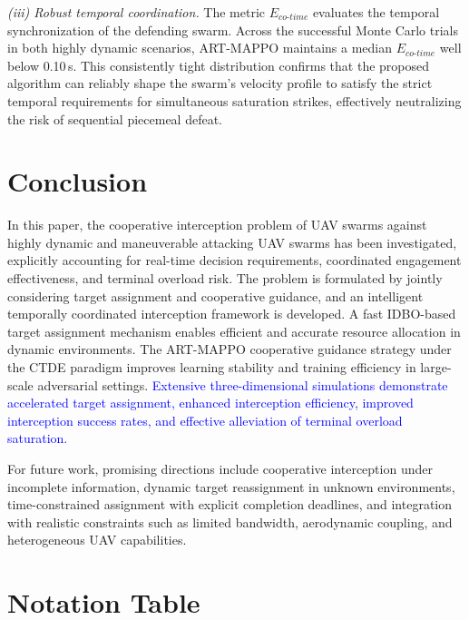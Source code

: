 \documentclass[lettersize,journal]{IEEEtran}
\begin{document}
\emph{(iii) Robust temporal coordination.} The metric $E_{co\text{-}time}$ evaluates the temporal synchronization of the defending swarm. Across the successful Monte Carlo trials in both highly dynamic scenarios, ART-MAPPO maintains a median $E_{co\text{-}time}$ well below 0.10\,s. This consistently tight distribution confirms that the proposed algorithm can reliably shape the swarm's velocity profile to satisfy the strict temporal requirements for simultaneous saturation strikes, effectively neutralizing the risk of sequential piecemeal defeat.



\section{Conclusion}
\label{sec:conclusion}

In this paper, the cooperative interception problem of UAV swarms against highly dynamic and
maneuverable attacking UAV swarms has been investigated, explicitly accounting for real-time
decision requirements, coordinated engagement effectiveness, and terminal overload risk.
The problem is formulated by jointly considering target assignment and cooperative guidance,
and an intelligent temporally coordinated interception framework is developed.
A fast IDBO-based target assignment mechanism enables efficient and accurate resource
allocation in dynamic environments.
The ART-MAPPO cooperative guidance strategy under the CTDE paradigm improves learning
stability and training efficiency in large-scale adversarial settings.
\textcolor{blue}{Extensive three-dimensional simulations demonstrate accelerated target assignment, enhanced interception
efficiency, improved interception success rates, and effective alleviation of terminal overload
saturation.}

For future work, promising directions include cooperative interception under incomplete
information, dynamic target reassignment in unknown environments, time-constrained assignment
with explicit completion deadlines, and integration with realistic constraints such as
limited bandwidth, aerodynamic coupling, and heterogeneous UAV capabilities.




\appendices
\begingroup\color{blue}
\section{Notation Table}
\label{app:notation}
\end{document}

